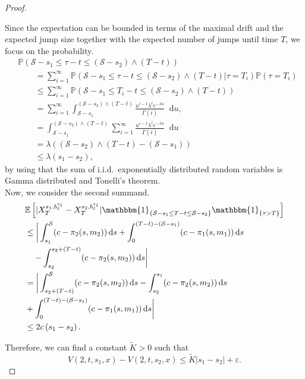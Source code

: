 \documentclass[a4paper]{scrartcl}
\theoremstyle{remark}
\theoremstyle{definition}
\numberwithin{equation}{section}
\newcommand*\diff{\mathop{}\!\mathrm{d}}
\newcommand{\ind}{\mathbbm{1}_}
\begin{document}
\begin{proof}
\begin{enumerate}
            
            Since the expectation can be bounded in terms of the maximal drift and the expected jump size together with the expected number of jumps until time $T$, we focus on the probability.
            \begin{align*}
                &\mathbb{P}(\mathcal{S}-s_1\leq \tau-t \leq  (\mathcal{S}-s_2) \wedge (T-t)) 
                \\& \qquad= \sum_{i=1}^{\infty} \mathbb{P}(\mathcal{S}-s_1\leq \tau -t\leq  (\mathcal{S}-s_2) \wedge (T-t)|\tau=T_i)\mathbb{P}(\tau=T_i)\\
                & \qquad \leq \sum_{i=1}^{\infty}\mathbb{P}(\mathcal{S}-s_1\leq T_i-t \leq  (\mathcal{S}-s_2) \wedge (T-t))\\
                & \qquad = \sum_{i=1}^{\infty} \int_{\mathcal{S}-s_1}^{ (\mathcal{S}-s_2) \wedge (T-t)} \frac{u^{i-1}\lambda^i e^{-\lambda u}}{\Gamma(i)}\diff u,\\
                & \qquad = \int_{\mathcal{S}-s_1}^{ (\mathcal{S}-s_2) \wedge (T-t)} \sum_{i=1}^{\infty}\frac{u^{i-1}\lambda^i e^{-\lambda u}}{\Gamma(i)} \diff u\\
                & \qquad = \lambda( (\mathcal{S}-s_2) \wedge (T-t)-(\mathcal{S}-s_1))\\
                & \qquad \leq \lambda(s_1-s_2),
            \end{align*}
            by using that the sum of i.i.d.~exponentially distributed random variables is Gamma distributed and Tonelli's theorem. \\
            Now, we consider the second summand.
            \begin{align*}
                 &\mathbb{E}\left[ |X_T^{s_1,b_\varepsilon^{s_1}} - X_T^{s_2,b_\varepsilon^{s_1}}|\ind{\{\mathcal{S}-s_1\leq T-t \leq \mathcal{S}-s_2\}}\ind{\{\tau > T\}}\right]\\
                 &\leq \bigg|\int_{s_1}^\mathcal{S} (c-\pi_2(s,m_2))\diff s+ \int_0^{(T-t)-(\mathcal{S}-s_1)}(c-\pi_1(s,m_1))\diff s \\
                & \quad- \int_{s_2}^{s_2 + (T-t)} (c-\pi_2(s,m_2)) \diff s \bigg|\\
                &= \bigg| \int_{s_2 + (T-t)}^{\mathcal{S}} (c-\pi_2(s,m_2)) \diff s - \int_{s_2}^{s_1} (c-\pi_2(s,m_2)) \diff s\\
                &+ \int_0^{(T-t)-(\mathcal{S}-s_1)}(c-\pi_1(s,m_1))\diff s \bigg| \\
                &\leq 2c\left(s_1-s_2 \right).
            \end{align*}
    \end{enumerate}
Therefore, we can find a constant $\tilde{K}>0$ such that
\begin{equation*}
    V(2,t,s_1,x)-V(2,t,s_2,x) \leq \tilde{K}|s_1-s_2|+\varepsilon.
\end{equation*}


\end{proof}
\end{document}
